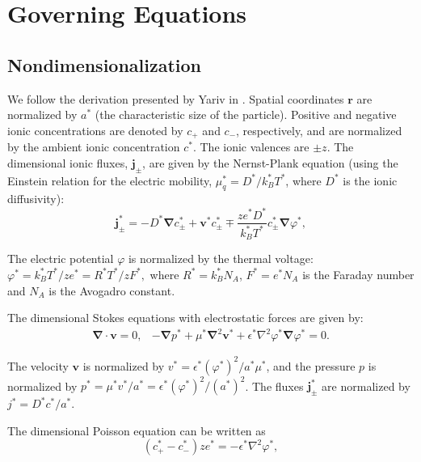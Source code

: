 \documentclass[MSc,beforeExam]{iitcsthesis}
\newcommand\eps \epsilon
\newcommand\Laplacian{\nabla^2}
\newcommand\bnabla{\boldsymbol{\nabla}}
\newcommand\bLaplacian{\boldsymbol{\nabla}^2}
\newcommand\bv{\boldsymbol{v}}
\newcommand\bj{\boldsymbol{j}}
\newcommand\br{\boldsymbol{r}}
\begin{document}
\section{Governing Equations} \label{sec:equations}

\subsection{Nondimensionalization}
We follow the derivation presented by Yariv in \cite{yariv2010asymptotic}.
Spatial coordinates $\br$ are normalized by $a^*$ 
(the characteristic size of the particle).
Positive and negative ionic concentrations are denoted by $c_+$ and $c_-$, respectively, and
are normalized by the ambient ionic concentration $c^*$. The ionic valences are $\pm z$.
The dimensional ionic fluxes, $\bj_\pm$, are given by the Nernst-Plank equation 
(using the Einstein relation for the electric mobility, $\mu_q^* = D^* / k_B^* T^*$, 
where $D^*$ is the ionic diffusivity):
\begin{equation}
\bj^*_\pm = 
-D^* \bnabla c^*_\pm + \bv^* c^*_\pm \mp \frac{z e^* D^*}{k_B^* T^*} c^*_\pm \bnabla \varphi^*,
\end{equation}

The electric potential $\varphi$ is normalized by the thermal voltage:
$\varphi^* = {k_B^* T^*}/{z e^*} = {R^* T^*}/{z F^*},$
where $R^* = k_B^* N_A$, $F^* = e^* N_A$ is the Faraday number and $N_A$ is the Avogadro constant.

The dimensional Stokes equations with electrostatic forces are given by:
\begin{equation} \begin{array}{cc}
\bnabla \cdot \bv = 0, &
-\bnabla p^* + \mu^* \bLaplacian \bv^* + \eps^* \Laplacian \varphi^* 
\bnabla \varphi^* = 0.
\end{array}\end{equation}

The velocity $\bv$ is normalized by $v^* = {\eps^* (\varphi^*)^2}/{a^* \mu^*}$,
and the pressure $p$ is normalized by $p^* = {\mu^* v^*}/{a^*} = {\eps^* (\varphi^*)^2}/{(a^*)^2}$.
The fluxes $\bj^*_\pm$ are normalized by $j^* = {D^* c^*}/{a^*}$.

The dimensional Poisson equation can be written as
\begin{equation}
(c^*_+ - c^*_-) z e^* = -\eps^* \Laplacian \varphi^*,
\end{equation}
\end{document}
